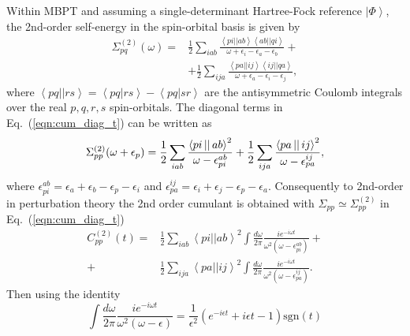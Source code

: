 \documentclass[aps,prb,twocolumn,groupaddress,floatfix]{revtex4}
\begin{document}
Within MBPT and assuming a single-determinant Hartree-Fock reference
$\left|\Phi\right>$, the 2nd-order 
self-energy in the spin-orbital basis is given by\cite{linderberg2004propagators,szabo1996modern}
\begin{equation}
\label{eqn:2ose}
\begin{split}
\Sigma_{pq}^{(2)}(\omega) =&
\frac{1}{2} \sum_{iab}
\frac{\left< pi \left| \right| ab \right> \left< ab \left| \right| qi \right>}
{\omega+\epsilon_{i}-\epsilon_{a}-\epsilon_{b}} + \\
&+\frac{1}{2} \sum_{ija}
\frac{\left< pa \left| \right| ij \right> \left< ij \left| \right| qa \right>}
{\omega+\epsilon_{a}-\epsilon_{i}-\epsilon_{j}},
\end{split}
\end{equation}
where $\left< pq \left| \right| rs \right> = \left< pq | rs \right> - \left< pq
| sr \right>$ are the antisymmetric Coulomb integrals over the real $p, q,
r, s$ spin-orbitals.
The diagonal terms in Eq.\ (\ref{eqn:cum_diag_t}) can be written as
\begin{equation}
\label{eqn:2oseatp}
\Sigma_{pp}^{(2)}(\omega+\epsilon_p) =
\frac{1}{2} \sum_{iab}
\frac{\left< pi \left| \right| ab \right>^2}
{\omega-\epsilon_{pi}^{ab}} + \\
\frac{1}{2} \sum_{ija}
\frac{\left< pa \left| \right| ij \right>^2}
{\omega-\epsilon_{pa}^{ij}},
\end{equation}
where
$\epsilon_{pi}^{ab} = \epsilon_{a}+\epsilon_{b}-\epsilon_{p}-\epsilon_{i}$
and
$\epsilon_{pa}^{ij} = \epsilon_{i}+\epsilon_{j}-\epsilon_{p}-\epsilon_{a}$.
Consequently to 2nd-order in perturbation theory the 2nd order
cumulant is obtained with
$\Sigma_{pp} \simeq \Sigma_{pp}^{(2)}$
in Eq.\ (\ref{eqn:cum_diag_t})
\begin{equation}
\label{eqn:cum_t_2ose}
\begin{split}
C^{(2)}_{pp}(t) =&
\frac{1}{2} \sum_{iab} \left< pi \left| \right| ab \right>^2
\int \frac{d\omega}{2\pi}
\frac{i e^{-i \omega t}}
{\omega^2\left(\omega-\epsilon_{pi}^{ab}\right)} + \\
+& \frac{1}{2} \sum_{ija} \left< pa \left| \right| ij \right>^2
\int \frac{d\omega}{2\pi}
\frac{i e^{-i \omega t}}
{\omega^2\left(\omega-\epsilon_{pa}^{ij}\right)}.
\end{split}
\end{equation}
Then using the identity
\begin{equation}
\int \frac{d\omega}{2\pi}
\frac{i e^{-i \omega t}}
{\omega^2\left(\omega-\epsilon\right)} = \frac{1}{\epsilon^2}
\left(e^{-i \epsilon t} +i \epsilon t -1 \right) \mathrm{sgn}(t)
\end{equation}
\end{document}
